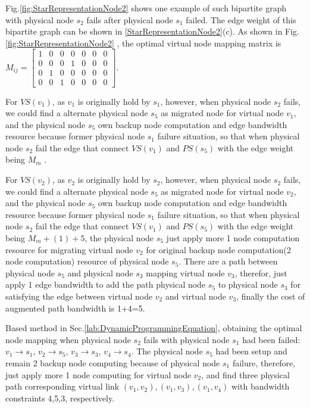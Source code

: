 Fig.\ref{fig:StarRepresentationNode2} shows one example of such  bipartite graph with physical node $s_2$ fails after physical node $s_1$ failed. The edge weight of this   bipartite graph can be shown in  \ref{StarRepresentationNode2}(c).
As shown in Fig.\ref{fig:StarRepresentationNode2} , the optimal virtual node mapping matrix is $M_{ij}=\left[ {\begin{array}{*{20}{c}}
1&0&0&0&0&0&0\\
0&0&0&1&0&0&0\\
0&1&0&0&0&0&0\\
0&0&1&0&0&0&0
\end{array}} \right]$.




For $VS(v_1)$, as $v_1$ is originally hold by $s_1$, however, when physical node $s_2$ fails, we could find a alternate physical node $s_5$ as migrated node for virtual node $v_1$, and the physical node $s_5$ own backup node computation and edge bandwidth resource because former physical node $s_1$ failure situation, so that when physical node $s_2$ fail the edge that connect $VS(v_1)$ and $PS(s_5)$ with the edge weight being $M_m$ .


For $VS(v_2)$, as $v_2$ is originally hold by $s_2$, however, when physical node $s_2$ fails, we could find a alternate physical node $s_5$ as migrated node for virtual node $v_2$, and the physical node $s_5$ own backup node computation and edge bandwidth resource because former physical node $s_1$ failure situation, so that when physical node $s_2$ fail the edge that connect $VS(v_1)$ and $PS(s_5)$ with the edge weight being $M_m+(1)+5$, the physical node $s_5$ just apply more 1 node computation resource for migrating virtual node $v_2$ for original backup node computation(2 node computation) resource of physical node $s_5$. There are a path between physical node $s_5$ and physical node $s_3$ mapping virtual node $v_3$, therefor, just apply 1 edge bandwidth to add the path physical node $s_5$ to physical node $s_3$ for satisfying the edge between virtual node $v_2$ and virtual node $v_3$, finally the cost of augmented path bandwidth is 1+4=5.

Based method in Sec.\ref{lab:DynamicProgrammingEquation}, obtaining the optimal node mapping when physical node $s_2$ fails with physical node $s_1$ had been failed: $v_1 \rightarrow s_1$, $v_2 \rightarrow s_5$, $v_3 \rightarrow s_3$, $v_4 \rightarrow s_4$. The physical node $s_5$ had been setup and remain 2 backup node computing because of physical node $s_1$ failure, therefore, just apply more 1 node computing for virtual node $v_2$, and find three physical path corresponding virtual link $(v_1,v_2),(v_1,v_3),(v_1,v_4)$ with bandwidth constraints 4,5,3, respectively.



